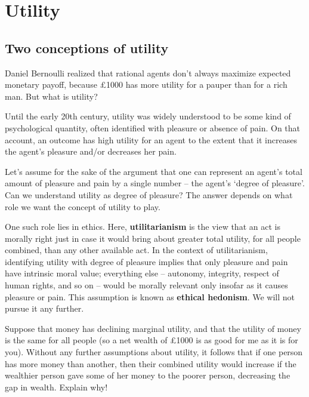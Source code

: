 \chapter{Utility}\label{ch:utility}



\section{Two conceptions of utility}

Daniel Bernoulli realized that rational agents don't always maximize
expected monetary payoff, because £1000 has more utility for a pauper
than for a rich man. But what is utility?

Until the early 20th century, utility was widely understood to be some
kind of psychological quantity, often identified with pleasure or absence
of pain. On that account, an outcome has high utility for an agent to
the extent that it increases the agent's pleasure and/or decreases her
pain.

Let's assume for the sake of the argument that one can represent an
agent's total amount of pleasure and pain by a single number -- the
agent's `degree of pleasure'. Can we understand utility as degree of
pleasure? The answer depends on what role we want the concept of
utility to play.

One such role lies in ethics. Here, \textbf{utilitarianism} is the
view that an act is morally right just in case it would bring about
greater total utility, for all people combined, than any other
available act. In the context of utilitarianism, identifying utility
with degree of pleasure implies that only pleasure and pain have
intrinsic moral value; everything else -- autonomy, integrity, respect
of human rights, and so on -- would be morally relevant only insofar
as it causes pleasure or pain. This assumption is known as \textbf{ethical
  hedonism}. We will not pursue it any further.

\begin{exercise}
  Suppose that money has declining marginal utility, and that the
  utility of money is the same for all people (so a net wealth of
  £1000 is as good for me as it is for you). Without any further
  assumptions about utility, it follows that if one person has more
  money than another, then their combined utility would increase if
  the wealthier person gave some of her money to the poorer person,
  decreasing the gap in wealth. Explain why!
\end{exercise}

